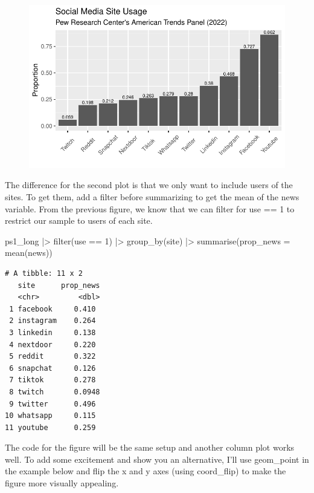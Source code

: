 \documentclass[
  letterpaper,
  DIV=11,
  numbers=noendperiod]{scrartcl}
\newenvironment{Shaded}{\begin{snugshade}}{\end{snugshade}}
\newcommand{\AttributeTok}[1]{\textcolor[rgb]{0.40,0.45,0.13}{#1}}
\newcommand{\DecValTok}[1]{\textcolor[rgb]{0.68,0.00,0.00}{#1}}
\newcommand{\FunctionTok}[1]{\textcolor[rgb]{0.28,0.35,0.67}{#1}}
\newcommand{\NormalTok}[1]{\textcolor[rgb]{0.00,0.23,0.31}{#1}}
\newcommand{\SpecialCharTok}[1]{\textcolor[rgb]{0.37,0.37,0.37}{#1}}
\begin{document}
\begin{figure}[H]

{\centering \includegraphics{ps1_ml_files/figure-pdf/unnamed-chunk-22-1.pdf}

}

\end{figure}

The difference for the second plot is that we only want to include users
of the sites. To get them, add a filter before summarizing to get the
mean of the news variable. From the previous figure, we know that we can
filter for use == 1 to restrict our sample to users of each site.

\begin{Shaded}
\begin{Highlighting}[]
\NormalTok{ps1\_long }\SpecialCharTok{|\textgreater{}} 
  \FunctionTok{filter}\NormalTok{(use }\SpecialCharTok{==} \DecValTok{1}\NormalTok{) }\SpecialCharTok{|\textgreater{}} 
  \FunctionTok{group\_by}\NormalTok{(site) }\SpecialCharTok{|\textgreater{}} 
  \FunctionTok{summarise}\NormalTok{(}\AttributeTok{prop\_news =} \FunctionTok{mean}\NormalTok{(news))}
\end{Highlighting}
\end{Shaded}

\begin{verbatim}
# A tibble: 11 x 2
   site      prop_news
   <chr>         <dbl>
 1 facebook     0.410 
 2 instagram    0.264 
 3 linkedin     0.138 
 4 nextdoor     0.220 
 5 reddit       0.322 
 6 snapchat     0.126 
 7 tiktok       0.278 
 8 twitch       0.0948
 9 twitter      0.496 
10 whatsapp     0.115 
11 youtube      0.259 
\end{verbatim}

The code for the figure will be the same setup and another column plot
works well. To add some excitement and show you an alternative, I'll use
geom\_point in the example below and flip the x and y axes (using
coord\_flip) to make the figure more visually appealing.
\end{document}
